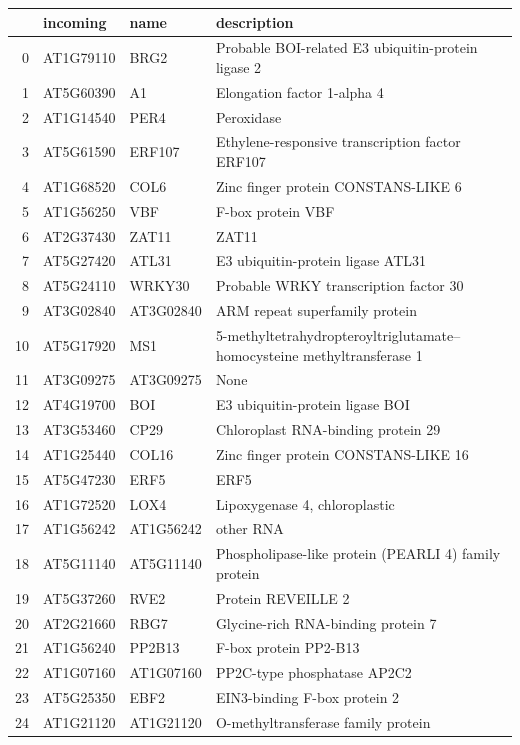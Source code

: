 \documentclass[11pt]{article}
\begin{document}
\begin{center}
\begin{tabular}{rlll}
 & incoming & name & description\\
\hline
0 & AT1G79110 & BRG2 & Probable BOI-related E3 ubiquitin-protein ligase 2\\
1 & AT5G60390 & A1 & Elongation factor 1-alpha 4\\
2 & AT1G14540 & PER4 & Peroxidase\\
3 & AT5G61590 & ERF107 & Ethylene-responsive transcription factor ERF107\\
4 & AT1G68520 & COL6 & Zinc finger protein CONSTANS-LIKE 6\\
5 & AT1G56250 & VBF & F-box protein VBF\\
6 & AT2G37430 & ZAT11 & ZAT11\\
7 & AT5G27420 & ATL31 & E3 ubiquitin-protein ligase ATL31\\
8 & AT5G24110 & WRKY30 & Probable WRKY transcription factor 30\\
9 & AT3G02840 & AT3G02840 & ARM repeat superfamily protein\\
10 & AT5G17920 & MS1 & 5-methyltetrahydropteroyltriglutamate--homocysteine methyltransferase 1\\
11 & AT3G09275 & AT3G09275 & None\\
12 & AT4G19700 & BOI & E3 ubiquitin-protein ligase BOI\\
13 & AT3G53460 & CP29 & Chloroplast RNA-binding protein 29\\
14 & AT1G25440 & COL16 & Zinc finger protein CONSTANS-LIKE 16\\
15 & AT5G47230 & ERF5 & ERF5\\
16 & AT1G72520 & LOX4 & Lipoxygenase 4, chloroplastic\\
17 & AT1G56242 & AT1G56242 & other RNA\\
18 & AT5G11140 & AT5G11140 & Phospholipase-like protein (PEARLI 4) family protein\\
19 & AT5G37260 & RVE2 & Protein REVEILLE 2\\
20 & AT2G21660 & RBG7 & Glycine-rich RNA-binding protein 7\\
21 & AT1G56240 & PP2B13 & F-box protein PP2-B13\\
22 & AT1G07160 & AT1G07160 & PP2C-type phosphatase AP2C2\\
23 & AT5G25350 & EBF2 & EIN3-binding F-box protein 2\\
24 & AT1G21120 & AT1G21120 & O-methyltransferase family protein\\
\end{tabular}
\end{center}
\end{document}
